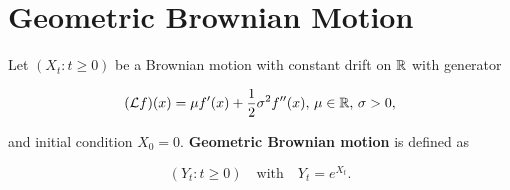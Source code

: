 \section{Geometric Brownian Motion}

Let $(X_t: t \ge 0)$ be a Brownian motion with constant drift on $\mathbb{R}$ with generator

\begin{equation*}
    (\mathcal{L}f)(x) = \mu f'(x) + \frac{1}{2} \sigma^2 f''(x), \, \mu \in \mathbb{R},\, \sigma > 0,
\end{equation*}

and initial condition $X_0 = 0$. \textbf{Geometric Brownian motion} is defined as

\begin{equation*}
    (Y_t: t \ge 0) \quad \text{with} \quad Y_t = e^{X_t}.
\end{equation*}

